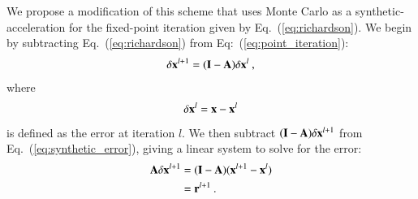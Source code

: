 \documentclass[preprint,12pt]{elsarticle}
\newcommand{\vA}{\ensuremath{\ve{A}}}
\newcommand{\vx}{\ensuremath{\ve{x}}}
\newcommand{\vr}{\ensuremath{\ve{r}}}
\newcommand{\vI}{\ensuremath{\ve{I}}}
\begin{document}
We propose a modification of this scheme that uses Monte Carlo as a
synthetic-acceleration for the fixed-point iteration given by
Eq.~(\ref{eq:richardson}). We begin by subtracting Eq.~(\ref{eq:richardson})
from Eq:~(\ref{eq:point_iteration}):
\begin{equation}
  \delta \vx^{l+1} = (\vI - \vA)\delta \vx^{l}\:,
  \label{eq:synthetic_error}
\end{equation}
where
\begin{equation}
  \delta \vx^{l} = \vx - \vx^{l}
\end{equation}
is defined as the error at iteration $l$. We then subtract $(\vI-\vA)
\delta \vx^{l+1}$ from Eq.~(\ref{eq:synthetic_error}), giving a linear
system to solve for the error:
\begin{equation}
  \begin{split}
    \vA \delta \vx^{l+1} &= (\vI - \vA)(\vx^{l+1} - \vx^{l}) \\ &=
    \vr^{l+1}\:.
  \end{split}
  \label{eq:synthetic_error2}
\end{equation}
\end{document}
